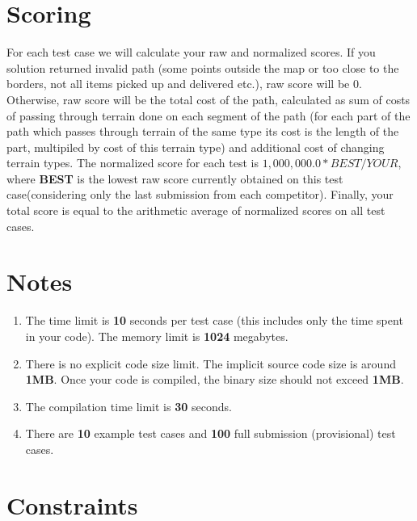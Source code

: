 \documentclass[hyperref,UTF8]{ctexart}
\theoremstyle{definition}
\theoremstyle{remark}
\numberwithin{equation}{subsection}
\newcommand{\Emph}{\textbf}
\begin{document}
\section{Scoring}
\label{sec:Scoring}

	For each test case we will calculate your raw and normalized scores. If you solution returned invalid path (some points outside
	the map or too close to the borders, not all items picked up and delivered etc.), raw score will be 0. Otherwise, raw score will be
	the total cost of the path, calculated as sum of costs of passing through terrain done on each segment of the path (for each part
	of the path which passes through terrain of the same type its cost is the length of the part, multipiled by cost of this terrain type)
	and additional cost of changing terrain types. The normalized score for each test is $1,000,000.0 \ast BEST / YOUR$, where \Emph{BEST}
	is the lowest raw score currently obtained on this test case(considering only the last submission from each competitor). Finally,
	your total score is equal to the arithmetic average of normalized scores on all test cases.
	
\section{Notes}	

	\begin{enumerate}[(1)]
	
		\item The time limit is \Emph{10} seconds per test case (this includes only the time spent in your code). The memory limit is \Emph{1024} megabytes.
		
		\item There is no explicit code size limit. The implicit source code size is around \Emph{1MB}. Once your code is compiled,
		the binary size should not exceed \Emph{1MB}.
		
		\item The compilation time limit is \Emph{30} seconds.
		
		\item There are \Emph{10} example test cases and \Emph{100} full submission (provisional) test cases.
		
	\end{enumerate}
	
	
\section{Constraints}	
	
\end{document}
